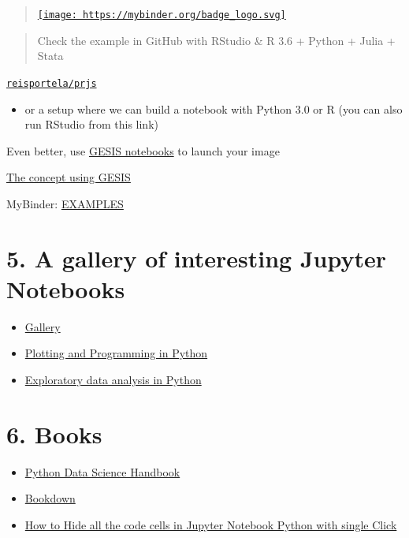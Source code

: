 \documentclass[
  12pt,
]{article}
\providecommand{\tightlist}{%
  \setlength{\itemsep}{0pt}\setlength{\parskip}{0pt}}
\begin{document}
\begin{quote}
\href{https://mybinder.org/v2/gh/reisportela/R_Training/HEAD?urlpath=lab}{\texttt{[image: https://mybinder.org/badge\_logo.svg]}}
\end{quote}

\begin{quote}
Check the example in GitHub with RStudio \& R 3.6 + Python + Julia +
Stata
\end{quote}

\href{https://github.com/reisportela/prjs}{\texttt{reisportela/prjs}}

\begin{itemize}
\tightlist
\item
  or a setup where we can build a notebook with Python 3.0 or R (you can
  also run RStudio from this link)
\end{itemize}

Even better, use \href{https://notebooks.gesis.org/hub/home}{GESIS
notebooks} to launch your image

\href{https://notebooks.gesis.org/user/reisportela@gmail.com}{The
concept using GESIS}

MyBinder: \href{https://github.com/binder-examples}{EXAMPLES}

\hypertarget{a-gallery-of-interesting-jupyter-notebooks}{%
\section{5. A gallery of interesting Jupyter
Notebooks}\label{a-gallery-of-interesting-jupyter-notebooks}}

\begin{itemize}
\item
  \href{https://github.com/jupyter/jupyter/wiki/A-gallery-of-interesting-Jupyter-Notebooks}{Gallery}
\item
  \href{https://swcarpentry.github.io/python-novice-gapminder/}{Plotting
  and Programming in Python}
\item
  \href{https://nbviewer.jupyter.org/github/Tanu-N-Prabhu/Python/blob/master/Exploratory_data_Analysis.ipynb}{Exploratory
  data analysis in Python}
\end{itemize}

\hypertarget{books}{%
\section{6. Books}\label{books}}

\begin{itemize}
\item
  \href{https://jakevdp.github.io/PythonDataScienceHandbook/}{Python
  Data Science Handbook}
\item
  \href{https://bookdown.org/}{Bookdown}
\item
  \href{https://www.youtube.com/watch?v=rJsWJMBksK0}{How to Hide all the
  code cells in Jupyter Notebook Python with single Click}
\end{itemize}
\end{document}
